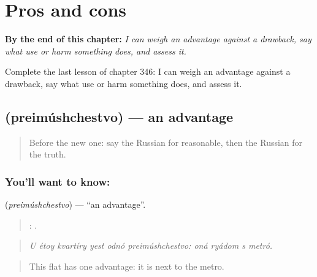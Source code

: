 
\chapter{Pros and cons}
\label{ch:ru-pros-and-cons}

\begin{chapteropening}
\textbf{By the end of this chapter:} \emph{I can weigh an advantage against a drawback, say what use or harm something does, and assess it.}

Complete the last lesson of chapter 346: I can weigh an advantage against a drawback, say what use or harm something does, and assess it.
\end{chapteropening}

\section[\texorpdfstring{\ru{преимущество} (preimúshchestvo)}{преимущество (preimúshchestvo)}]{ (preimúshchestvo) — an advantage}

\label{lesson:RU-C346-preimushchestvo}



\begin{quote}
Before the new one: say the Russian for reasonable, then the Russian for the truth.
\end{quote}

\subsection*{You'll want to know: }
\textbf{} (\emph{preimúshchestvo}) — \textquotedblleft{}an advantage\textquotedblright{}.

\begin{quote}
     :    .
\end{quote}

\begin{quote}
\emph{U étoy kvartíry yest odnó preimúshchestvo: oná ryádom s metró.}
\end{quote}

\begin{quote}
This flat has one advantage: it is next to the metro.
\end{quote}

